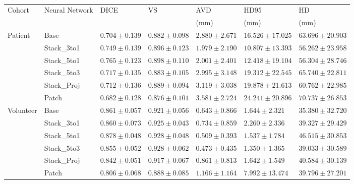 \begin{sidewaystable}[htbp]
   \centering
   \caption[Detailed Results for 3D Context]{}
   \begin{tabular}{l*{6}{l}}
      \toprule
      Cohort	& Neural Network	& DICE				& VS				& AVD				& HD95				& HD				\\
      			&					&					&					& (mm)				& (mm)				& (mm)				\\
      \midrule
      Patient   & Base  & $0.704 \pm 0.139$ & $0.882 \pm 0.098$ & $2.880 \pm 2.671$ & $16.526 \pm 17.025$ & $63.696 \pm 20.903$ \\
                & Stack\_3to1  & $0.749 \pm 0.139$ & $0.896 \pm 0.123$ & $\mathbf{1.979 \pm 2.190}$ & $\mathbf{10.807 \pm 13.393}$ & $\mathbf{56.262 \pm 23.958}$ \\
                & Stack\_5to1  & $\mathbf{0.765 \pm 0.123}$ & $\mathbf{0.898 \pm 0.110}$ & $2.001 \pm 2.401$ & $12.418 \pm 19.104$ & $56.304 \pm 28.746$ \\
                & Stack\_5to3  & $0.717 \pm 0.135$ & $0.883 \pm 0.105$ & $2.995 \pm 3.148$ & $19.312 \pm 22.545$ & $65.740 \pm 22.811$ \\
                & Stack\_Proj  & $0.712 \pm 0.136$ & $0.889 \pm 0.094$ & $3.119 \pm 3.038$ & $19.878 \pm 21.613$ & $60.762 \pm 22.985$ \\
                & Patch & $0.682 \pm 0.128$ & $0.876 \pm 0.101$ & $3.581 \pm 2.724$ & $24.241 \pm 20.896$ & $70.737 \pm 26.853$ \\                
      \midrule
      Volunteer & Base  & $0.861 \pm 0.057$ & $0.921 \pm 0.056$ & $0.643 \pm 0.866$ & $1.644  \pm 2.321 $ & $\mathbf{35.380 \pm 32.720}$ \\
                & Stack\_3to1  & $0.860 \pm 0.073$ & $0.925 \pm 0.043$ & $0.734 \pm 0.859$ & $2.260  \pm 2.336 $ & $39.327 \pm 29.429$ \\
                & Stack\_5to1  & $\mathbf{0.878 \pm 0.048}$ & $\mathbf{0.928 \pm 0.048}$ & $ 0.509 \pm 0.393	$ & $1.537  \pm 1.784 $ & $46.515 \pm 30.853$ \\
                & Stack\_5to3  & $0.855 \pm 0.052$ & $0.928 \pm 0.062$ & $\mathbf{0.473 \pm 0.435}$ & $\mathbf{1.350  \pm 1.365} $ & $39.033 \pm 30.589$ \\                
                & Stack\_Proj  & $0.842 \pm 0.051$ & $0.917 \pm 0.067$ & $0.861 \pm 0.813$ & $1.642  \pm 1.549 $ & $40.584 \pm 30.139$ \\
                & Patch & $0.806 \pm 0.068$ & $0.888 \pm 0.085$ & $1.166 \pm 1.164$ & $7.992  \pm 13.474$ & $39.796 \pm 27.201$ \\
      \bottomrule
   \end{tabular}
   \label{tab:results_3d_context}
\end{sidewaystable}


